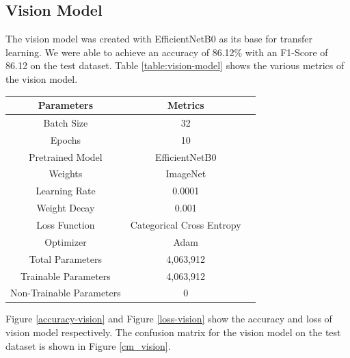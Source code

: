 \documentclass[fleqn, 10pt, twoside]{IOEGC}
\begin{document}
\subsection{Vision Model}
The vision model was created with EfficientNetB0 as its base for transfer learning. We were able to achieve an accuracy of 86.12\% with an F1-Score of 86.12 on the test dataset. Table \ref{table:vision-model} shows the various metrics of the vision model.
\begin{center}
	\begin{tabular}{ |c|c|c| }
		\hline
		\textbf{Parameters}      & \textbf{Metrics}          \\
		\hline
		Batch Size               & 32                        \\
		\hline
		Epochs                   & 10                        \\
		\hline
		Pretrained Model         & EfficientNetB0            \\
		\hline
		Weights                  & ImageNet                  \\
		\hline
		Learning Rate            & 0.0001                    \\
		\hline
		Weight Decay             & 0.001                     \\
		\hline
		Loss Function            & Categorical Cross Entropy \\
		\hline
		Optimizer                & Adam                      \\
		\hline
		Total Parameters         & 4,063,912                 \\
		\hline
		Trainable Parameters     & 4,063,912                 \\
		\hline
		Non-Trainable Parameters & 0                         \\
		\hline
	\end{tabular}
	\label{table:vision-model}

\end{center}

Figure \ref{accuracy-vision} and Figure \ref{loss-vision} show the accuracy and loss of vision model respectively. The confusion matrix for the vision model on the test dataset is shown in Figure \ref{cm_vision}.
\end{document}
